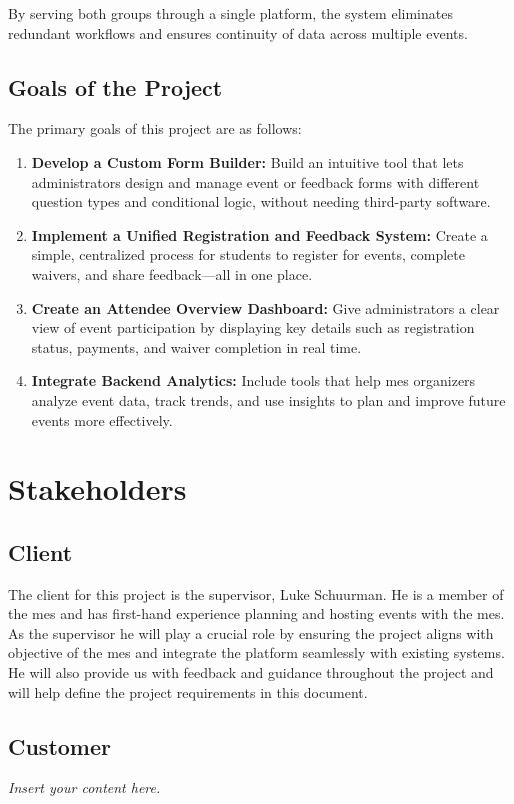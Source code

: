 \documentclass[12pt]{article}
\newcommand{\lips}{\textit{Insert your content here.}}
\begin{document}
By serving both groups through a single platform, the system eliminates redundant workflows and ensures continuity of
data across multiple events.

\subsection{Goals of the Project}

The primary goals of this project are as follows:

\begin{enumerate}
    \item \textbf{Develop a Custom Form Builder:} Build an intuitive tool that lets administrators design and manage
      event or feedback forms with different question types and conditional logic, without needing third-party software.
    \item \textbf{Implement a Unified Registration and Feedback System:} Create a simple, centralized process for
      students to register for events, complete waivers, and share feedback—all in one place.
    \item \textbf{Create an Attendee Overview Dashboard:} Give administrators a clear view of event participation by
      displaying key details such as registration status, payments, and waiver completion in real time.
    \item \textbf{Integrate Backend Analytics:} Include tools that help \gls{mes} organizers analyze event data, track
      trends, and use insights to plan and improve future events more effectively.
\end{enumerate}



\section{Stakeholders}
\subsection{Client}
The client for this project is the supervisor, Luke Schuurman. He is a member of the \gls{mes} and has first-hand
experience planning and hosting events with the \gls{mes}. As the supervisor he will play a crucial role by ensuring the
project aligns with objective of the \gls{mes} and integrate the platform seamlessly with existing systems. He will also
provide us with feedback and guidance throughout the project and will help define the project requirements in this
document.
\subsection{Customer}
\lips
\end{document}
